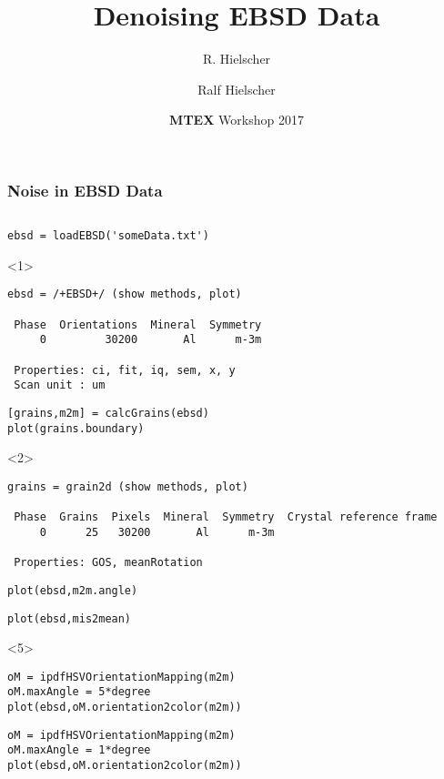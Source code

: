 \documentclass[comptress]{beamer}
\author{R. Hielscher}
\title{Denoising EBSD Data}
\institute{Faculty of Mathematics,\\
	Chemnitz University of Technology, Germany}
\date{{\bf{\color{red}M}TEX} Workshop 2017}
\author[R. Hielscher]{Ralf Hielscher}
\begin{document}
\frame[plain]{\titlepage}






\begin{frame}[fragile]
  \frametitle{Noise in EBSD Data}

  \begin{columns}
    \begin{column}{8.3cm}
      \begin{overlayarea}{\textwidth}{\textheight}
      \begin{lstlisting}[style=input]
ebsd = loadEBSD('someData.txt')
\end{lstlisting}
\begin{onlyenv}<1>
        \begin{lstlisting}[style=output]
ebsd = /+EBSD+/ (show methods, plot)

 Phase  Orientations  Mineral  Symmetry
     0         30200       Al      m-3m

 Properties: ci, fit, iq, sem, x, y
 Scan unit : um
\end{lstlisting}
\end{onlyenv}
\pause
\vspace{-0.33cm}
      \begin{lstlisting}[style=input]
[grains,m2m] = calcGrains(ebsd)
plot(grains.boundary)
\end{lstlisting}
\begin{onlyenv}<2>
          \begin{lstlisting}[style=output]
grains = grain2d (show methods, plot)

 Phase  Grains  Pixels  Mineral  Symmetry  Crystal reference frame
     0      25   30200       Al      m-3m

 Properties: GOS, meanRotation
\end{lstlisting}
\end{onlyenv}
\pause
\vspace{-0.33cm}
\begin{lstlisting}[style=input]
plot(ebsd,m2m.angle)
\end{lstlisting}
\pause
\vspace{-0.33cm}
\begin{lstlisting}[style=input]
plot(ebsd,mis2mean)
\end{lstlisting}
\pause
\vspace{-0.33cm}
\begin{onlyenv}<5>
\begin{lstlisting}[style=input]
oM = ipdfHSVOrientationMapping(m2m)
oM.maxAngle = 5*degree
plot(ebsd,oM.orientation2color(m2m))
\end{lstlisting}
\end{onlyenv}
\pause
\begin{lstlisting}[style=input]
oM = ipdfHSVOrientationMapping(m2m)
oM.maxAngle = 1*degree
plot(ebsd,oM.orientation2color(m2m))
\end{lstlisting}


\end{overlayarea}
\end{column}
\end{columns}
\end{frame}
\end{document}
